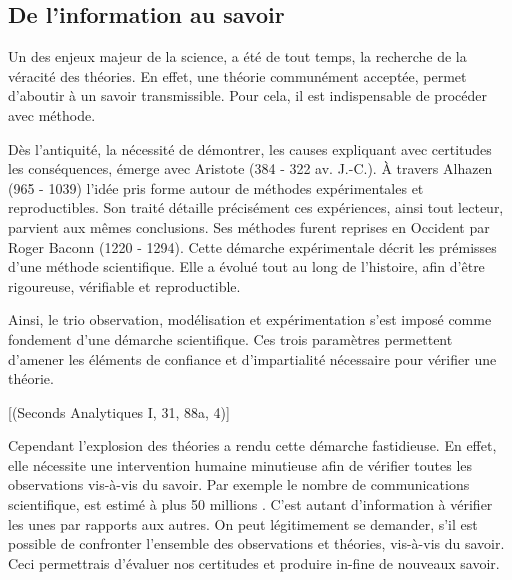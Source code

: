 \begin{refsection}
\chapter*{De l'information au savoir}

Un des enjeux majeur de la science, a été de tout temps, la recherche de la véracité des théories. En effet, une théorie communément acceptée, permet d'aboutir à un savoir transmissible. Pour cela, il est indispensable de procéder avec méthode.

Dès l'antiquité, la nécessité de démontrer, les causes expliquant avec certitudes les conséquences, émerge avec Aristote (384 - 322 av. J.-C.). À travers Alhazen (965 - 1039) l'idée pris forme autour de méthodes expérimentales et reproductibles. Son traité  détaille précisément ces expériences, ainsi tout lecteur, parvient aux mêmes conclusions. Ses méthodes furent reprises en Occident par Roger Baconn (1220 - 1294). Cette démarche expérimentale décrit les prémisses d'une méthode scientifique. Elle a évolué tout au long de l'histoire, afin d'être rigoureuse, vérifiable et reproductible.

Ainsi, le trio observation, modélisation et expérimentation s'est imposé comme fondement d'une démarche scientifique. Ces trois paramètres permettent d'amener les éléments de confiance et d'impartialité nécessaire pour vérifier une théorie.

[(Seconds Analytiques I, 31, 88a, 4)]


Cependant l'explosion des théories a rendu cette démarche fastidieuse. En effet, elle nécessite une intervention humaine minutieuse afin de vérifier toutes les observations vis-à-vis du savoir. Par exemple le nombre de communications scientifique, est estimé à plus 50 millions \cite{LEAP:LEAP0509}. C'est autant d'information à vérifier les unes par rapports aux autres. On peut légitimement se demander, s'il est possible de confronter l'ensemble des observations et théories, vis-à-vis du savoir. Ceci permettrais d'évaluer nos certitudes et produire in-fine de nouveaux savoir.


\end{refsection}
